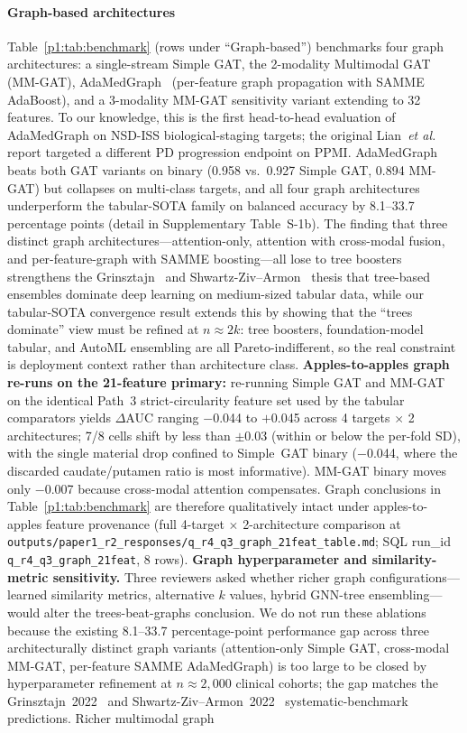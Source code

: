 \paragraph*{Graph-based architectures} Table~\ref{p1:tab:benchmark} (rows under ``Graph-based'') benchmarks four graph architectures: a single-stream Simple GAT, the 2-modality Multimodal GAT (MM-GAT), AdaMedGraph~\cite{adamedgraph} (per-feature graph propagation with SAMME AdaBoost), and a 3-modality MM-GAT sensitivity variant extending to 32 features. To our knowledge, this is the first head-to-head evaluation of AdaMedGraph on NSD-ISS biological-staging targets; the original Lian~\textit{et al.} report targeted a different PD progression endpoint on PPMI. AdaMedGraph beats both GAT variants on binary (0.958 vs.\ 0.927 Simple GAT, 0.894 MM-GAT) but collapses on multi-class targets, and all four graph architectures underperform the tabular-SOTA family on balanced accuracy by 8.1--33.7 percentage points (detail in Supplementary Table~S-1b). The finding that three distinct graph architectures---attention-only, attention with cross-modal fusion, and per-feature-graph with SAMME boosting---all lose to tree boosters strengthens the Grinsztajn~\cite{grinsztajn2022} and Shwartz-Ziv--Armon~\cite{shwartzziv2022} thesis that tree-based ensembles dominate deep learning on medium-sized tabular data, while our tabular-SOTA convergence result extends this by showing that the ``trees dominate'' view must be refined at $n{\approx}2k$: tree boosters, foundation-model tabular, and AutoML ensembling are all Pareto-indifferent, so the real constraint is deployment context rather than architecture class. \textbf{Apples-to-apples graph re-runs on the 21-feature primary:} re-running Simple GAT and MM-GAT on the identical Path~3 strict-circularity feature set used by the tabular comparators yields $\Delta$AUC ranging $-$0.044 to $+$0.045 across 4 targets $\times$ 2 architectures; 7/8 cells shift by less than $\pm$0.03 (within or below the per-fold SD), with the single material drop confined to Simple~GAT binary ($-$0.044, where the discarded caudate/putamen ratio is most informative). MM-GAT binary moves only $-$0.007 because cross-modal attention compensates. Graph conclusions in Table~\ref{p1:tab:benchmark} are therefore qualitatively intact under apples-to-apples feature provenance (full 4-target $\times$ 2-architecture comparison at \texttt{outputs/paper1\_r2\_responses/q\_r4\_q3\_graph\_21feat\_table.md}; SQL run\_id \texttt{q\_r4\_q3\_graph\_21feat}, 8 rows). \textbf{Graph hyperparameter and similarity-metric sensitivity.} Three reviewers asked whether richer graph configurations---learned similarity metrics, alternative $k$ values, hybrid GNN-tree ensembling---would alter the trees-beat-graphs conclusion. We do not run these ablations because the existing 8.1--33.7 percentage-point performance gap across three architecturally distinct graph variants (attention-only Simple GAT, cross-modal MM-GAT, per-feature SAMME AdaMedGraph) is too large to be closed by hyperparameter refinement at $n \approx 2{,}000$ clinical cohorts; the gap matches the Grinsztajn~2022~\cite{grinsztajn2022} and Shwartz-Ziv--Armon~2022~\cite{shwartzziv2022} systematic-benchmark predictions. Richer multimodal graph 